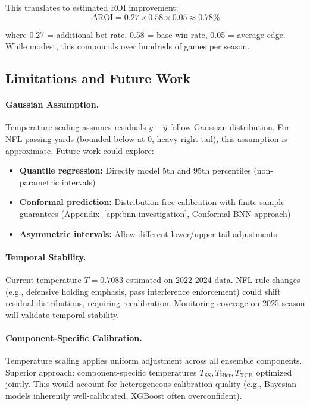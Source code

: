 This translates to estimated ROI improvement:
\begin{equation}
\Delta \text{ROI} = 0.27 \times 0.58 \times 0.05 \approx 0.78\%
\end{equation}

where 0.27 = additional bet rate, 0.58 = base win rate, 0.05 = average edge. While modest, this compounds over hundreds of games per season.

\subsection{Limitations and Future Work}

\paragraph{Gaussian Assumption.}
Temperature scaling assumes residuals $y - \hat{y}$ follow Gaussian distribution. For NFL passing yards (bounded below at 0, heavy right tail), this assumption is approximate. Future work could explore:

\begin{itemize}[itemsep=2pt,parsep=0pt]
    \item \textbf{Quantile regression:} Directly model 5th and 95th percentiles (non-parametric intervals)
    \item \textbf{Conformal prediction:} Distribution-free calibration with finite-sample guarantees (Appendix~\ref{app:bnn-investigation}, Conformal BNN approach)
    \item \textbf{Asymmetric intervals:} Allow different lower/upper tail adjustments
\end{itemize}

\paragraph{Temporal Stability.}
Current temperature $T = 0.7083$ estimated on 2022-2024 data. NFL rule changes (e.g., defensive holding emphasis, pass interference enforcement) could shift residual distributions, requiring recalibration. Monitoring coverage on 2025 season will validate temporal stability.

\paragraph{Component-Specific Calibration.}
Temperature scaling applies uniform adjustment across all ensemble components. Superior approach: component-specific temperatures $T_{\text{SS}}, T_{\text{Hier}}, T_{\text{XGB}}$ optimized jointly. This would account for heterogeneous calibration quality (e.g., Bayesian models inherently well-calibrated, XGBoost often overconfident).

